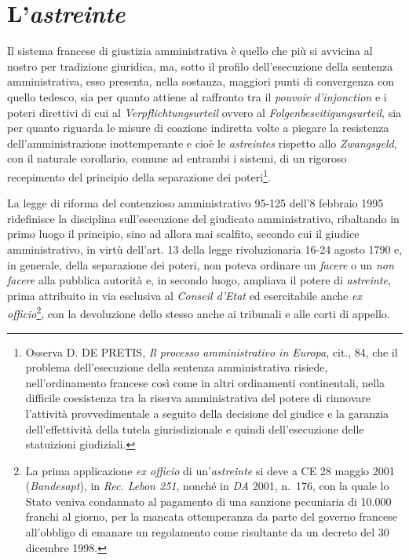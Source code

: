 \documentclass[12pt,it,a4paper,]{report}
\begin{document}
\hypertarget{lastreinte}{%
\section{\texorpdfstring{L'\emph{astreinte}}{L'astreinte}}\label{lastreinte}}

Il sistema francese di giustizia amministrativa è quello che più si
avvicina al nostro per tradizione giuridica, ma, sotto il profilo
dell'esecuzione della sentenza amministrativa, esso presenta, nella
sostanza, maggiori punti di convergenza con quello tedesco, sia per
quanto attiene al raffronto tra il \emph{pouvoir d'injonction} e i
poteri direttivi di cui al \emph{Verpflichtungsurteil} ovvero al
\emph{Folgenbeseitigungsurteil}, sia per quanto riguarda le misure di
coazione indiretta volte a piegare la resistenza dell'amministrazione
inottemperante e cioè le \emph{astreintes} rispetto allo
\emph{Zwangsgeld}, con il naturale corollario, comune ad entrambi i
sistemi, di un rigoroso recepimento del principio della separazione dei
poteri\footnote{Osserva D. DE PRETIS, \emph{Il processo amministrativo
  in Europa}, cit., 84, che il problema dell'esecuzione della sentenza
  amministrativa risiede, nell'ordinamento francese così come in altri
  ordinamenti continentali, nella difficile coesistenza tra la riserva
  amministrativa del potere di rinnovare l'attività provvedimentale a
  seguito della decisione del giudice e la garanzia dell'effettività
  della tutela giurisdizionale e quindi dell'esecuzione delle
  statuizioni giudiziali.}.

La legge di riforma del contenzioso amministrativo 95-125 dell'8
febbraio 1995 ridefinisce la disciplina sull'esecuzione del giudicato
amministrativo, ribaltando in primo luogo il principio, sino ad allora
mai scalfito, secondo cui il giudice amministrativo, in virtù dell'art.
13 della legge rivoluzionaria 16-24 agosto 1790 e, in generale, della
separazione dei poteri, non poteva ordinare un \emph{facere} o un
\emph{non facere} alla pubblica autorità e, in secondo luogo, ampliava
il potere di \emph{astreinte}, prima attribuito in via esclusiva al
\emph{Conseil d'Etat} ed esercitabile anche \emph{ex
officio}\footnote{La prima applicazione \emph{ex officio} di
  un'\emph{astreinte} si deve a CE 28 maggio 2001 (\emph{Bandesapt}), in
  \emph{Rec. Lebon 251}, nonché in \emph{DA} 2001, n.~176, con la quale
  lo Stato veniva condannato al pagamento di una sanzione pecuniaria di
  10.000 franchi al giorno, per la mancata ottemperanza da parte del
  governo francese all'obbligo di emanare un regolamento come risultante
  da un decreto del 30 dicembre 1998.}, con la devoluzione dello stesso
anche ai tribunali e alle corti di appello.
\end{document}
